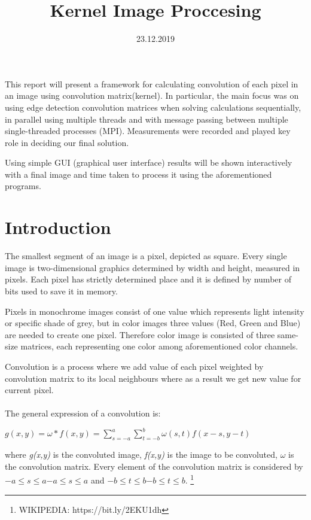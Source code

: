 \documentclass{article}
\title{ \textbf{ Kernel Image Proccesing} }
\author{ \textbf{ Elmir Šut} \\ \href \\ \href UP FAMNIT \\ \href{E-mail:\textit{elmirsutisz@gmail.com} }}
\begin{document}
\twocolumn
\date{23.12.2019}
\maketitle

\begin{textit}

{This report will present a framework for calculating convolution of each pixel in an image using convolution matrix(kernel). In particular, the main focus was on using edge detection convolution matrices when solving calculations sequentially, in parallel using multiple threads and with
message passing between multiple single-threaded processes (MPI). Measurements were recorded and played key role in deciding our final solution. 

Using simple GUI (graphical user interface) results will be shown interactively with a final image and time taken to process it using  the aforementioned programs.}
 
\end{textit}

\section{Introduction}

The smallest segment of an image is a pixel, depicted as square. Every single image is two-dimensional graphics determined by width and height, measured in pixels. Each pixel has strictly determined place and it is defined by number of bits used to save it in memory.  

Pixels in monochrome images  consist of one value which represents light intensity or specific shade of grey, but in color images three values (Red, Green and Blue) are needed to create one pixel. Therefore color image is consisted of three same-size matrices, each representing one color among aforementioned color channels.

Convolution is a process  where we add value of each pixel weighted by convolution matrix to its local neighbours where as a result we get new value for current pixel.\\
\\
The general expression of a convolution is: 


 $
{\displaystyle g(x,y)=\omega *f(x,y)=\sum _{s=-a}^{a}{\sum _{t=-b}^{b}{\omega (s,t)f(x-s,y-t)}}} 
 $
 
 
where  \textit{g(x,y)}  is the convoluted image, \textit{f(x,y)}  \justify is the image to be convoluted, $ \omega $ is the convolution matrix. Every element of the convolution matrix is considered by $  {\displaystyle -a\leq s\leq a}{\displaystyle -a\leq s\leq a} $ and ${\displaystyle -b\leq t\leq b}{\displaystyle -b\leq t\leq b}.$ \footnote{WIKIPEDIA: https://bit.ly/2EKU1dh}\\
\end{document}
